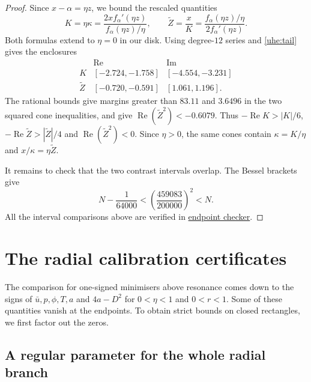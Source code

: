 \documentclass[a4paper,11pt]{amsart}
\newcommand{\repofile}[2]{\href{https://github.com/MColbrook/transmission-shape-optimisation/blob/main/#1}{#2}}
\numberwithin{equation}{section}
\theoremstyle{plain}
\theoremstyle{definition}
\begin{document}
\begin{proof}
Since \(x-\alpha=\eta z\), we bound the rescaled quantities
\[
 K=\eta\kappa
   =\frac{2x f_\alpha'(\eta z)}{f_\alpha(\eta z)/\eta},
 \qquad
 \widetilde Z=\frac{x}{K}
   =\frac{f_\alpha(\eta z)/\eta}{2f_\alpha'(\eta z)}.
\]
Both formulas extend to \(\eta=0\) in our disk. Using degree-\(12\)
series and \eqref{uhe:tail} gives the enclosures
\[
 \begin{array}{c|cc}
       &\operatorname{Re}&\operatorname{Im}\\ \hline
 K&[-2.724,-1.758]&[-4.554,-3.231]\\
 \widetilde Z&[-0.720,-0.591]&[1.061,1.196].
 \end{array}
\]
The rational bounds give margins greater than \(83.11\) and
\(3.6496\) in the two squared cone inequalities, and give
\(\operatorname{Re}(\widetilde Z^2)<-0.6079\).
Thus \(-\operatorname{Re}K>|K|/6\),
\(-\operatorname{Re}\widetilde Z>|\widetilde Z|/4\) and
\(\operatorname{Re}(\widetilde Z^2)<0\). Since \(\eta>0\), the
same cones contain \(\kappa=K/\eta\) and
\(x/\kappa=\eta\widetilde Z\).

It remains to check that the two contrast intervals overlap.
The Bessel brackets give
\[
 N-\frac1{64000}
 <\left(\frac{459083}{200000}\right)^2<N.
\]
All the interval comparisons above are verified in
\repofile{subresonant/unit_midrange/cap/hessian_endpoint_check.py}{endpoint checker}.
\end{proof}

\section{The radial calibration certificates}\label{sup:radial}

The comparison for one-signed minimisers above resonance comes
down to the signs of \(\bar u,p,\phi,T,a\) and \(4a-D^2\) for
\(0<\eta<1\) and \(0<r<1\). Some of these quantities vanish
at the endpoints. To obtain strict bounds on closed rectangles,
we first factor out the zeros.

\subsection{A regular parameter for the whole radial branch}
\end{document}
